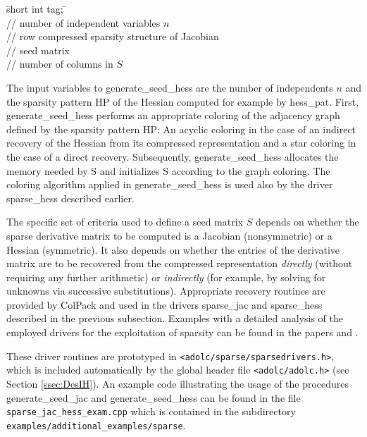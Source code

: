 \documentclass[11pt,twoside]{article}
\begin{document}
\begin{tabbing}
\hspace{0.5in}\={\sf short int tag;} \hspace{1.3in}\= \kill    %
\\
 \> // number of independent variables $n$\\
 \> // row compressed sparsity structure
of Jacobian\\
 \> // seed matrix\\
 \> // number of columns in $S$
\end{tabbing}
The input variables to {\sf generate\_seed\_hess} are the number of independents $n$
and the sparsity pattern {\sf HP} of the Hessian computed for example
by {\sf hess\_pat}. First, {\sf generate\_seed\_hess} performs an
appropriate coloring of the adjacency graph defined by the sparsity
pattern {\sf HP}: An acyclic coloring in the case of an indirect recovery of the Hessian from its
    compressed representation and a star coloring in the case of a direct recovery.
 Subsequently, {\sf generate\_seed\_hess} allocates the memory needed by {\sf
 S} and initializes {\sf S} according to the graph coloring.
The coloring algorithm applied in {\sf
  generate\_seed\_hess} is used also by the driver {\sf sparse\_hess}
described earlier.

The specific set of criteria used to define a seed matrix $S$ depends
on whether the sparse derivative matrix 
to be computed is a Jacobian (nonsymmetric) or a Hessian (symmetric).  
It also depends on whether the entries of the derivative matrix  are to be
recovered from the compressed representation \emph{directly}
(without requiring any further arithmetic) or \emph{indirectly} (for
example, by solving for unknowns via successive substitutions).
Appropriate recovery routines are provided by ColPack and used 
in the drivers {\sf sparse\_jac} and {\sf sparse\_hess} described in
the previous subsection. Examples with a detailed analysis of the 
employed drivers for the exploitation of sparsity can be found in the
papers \cite{GePoTaWa06} and \cite{GePoWa08}.


These driver routines are prototyped in 
\verb=<adolc/sparse/sparsedrivers.h>=, which is included automatically by the
global header file \verb=<adolc/adolc.h>= (see Section \ref{ssec:DesIH}). 
An example code illustrating the usage of the procedures {\sf
generate\_seed\_jac} and {\sf generate\_seed\_hess} can be found in the file 
\verb=sparse_jac_hess_exam.cpp= which is contained in the subdirectory
\verb=examples/additional_examples/sparse=.
%
\end{document}
